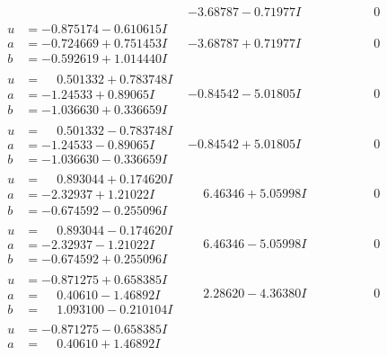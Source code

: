 \documentclass[1p]{elsarticle_modified}
\theoremstyle{definition}
\begin{document}
$$\begin{array}{c|c|c}
 & -3.68787 - 0.71977 I & \phantom{-0.000000 } 0 \\ \hline\begin{aligned}
u &= -0.875174 - 0.610615 I \\
a &= -0.724669 + 0.751453 I \\
b &= -0.592619 + 1.014440 I\end{aligned}
 & -3.68787 + 0.71977 I & \phantom{-0.000000 } 0 \\ \hline\begin{aligned}
u &= \phantom{-}0.501332 + 0.783748 I \\
a &= -1.24533 + 0.89065 I \\
b &= -1.036630 + 0.336659 I\end{aligned}
 & -0.84542 - 5.01805 I & \phantom{-0.000000 } 0 \\ \hline\begin{aligned}
u &= \phantom{-}0.501332 - 0.783748 I \\
a &= -1.24533 - 0.89065 I \\
b &= -1.036630 - 0.336659 I\end{aligned}
 & -0.84542 + 5.01805 I & \phantom{-0.000000 } 0 \\ \hline\begin{aligned}
u &= \phantom{-}0.893044 + 0.174620 I \\
a &= -2.32937 + 1.21022 I \\
b &= -0.674592 - 0.255096 I\end{aligned}
 & \phantom{-}6.46346 + 5.05998 I & \phantom{-0.000000 } 0 \\ \hline\begin{aligned}
u &= \phantom{-}0.893044 - 0.174620 I \\
a &= -2.32937 - 1.21022 I \\
b &= -0.674592 + 0.255096 I\end{aligned}
 & \phantom{-}6.46346 - 5.05998 I & \phantom{-0.000000 } 0 \\ \hline\begin{aligned}
u &= -0.871275 + 0.658385 I \\
a &= \phantom{-}0.40610 - 1.46892 I \\
b &= \phantom{-}1.093100 - 0.210104 I\end{aligned}
 & \phantom{-}2.28620 - 4.36380 I & \phantom{-0.000000 } 0 \\ \hline\begin{aligned}
u &= -0.871275 - 0.658385 I \\
a &= \phantom{-}0.40610 + 1.46892 I \\

\end{aligned}
\end{array}$$
\end{document}
